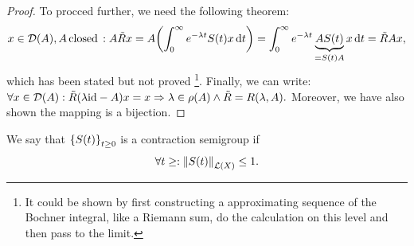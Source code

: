 \documentclass{article}
\begin{document}
\begin{proof}
    To procced further, we need the following theorem:
    \[
	    x \in \mathcal{D}(A), A \, \text{closed} \,: A \tilde{R}x = A\qty(\int_0^{\infty}e^{-\lambda t}S(t)x \dd{t}) = \int_0^{\infty}e^{- \lambda t}\underbrace{A S(t)}_{= S(t)A} x \dd{t} = \tilde{R}Ax,
    \]
    which has been stated but not proved \footnote{It could be shown by first constructing a approximating sequence of the Bochner integral, like a Riemann sum, do the calculation on this level and then pass to the limit.}. Finally, we can write: $\forall x \in \mathcal{D}(A): \tilde{R}\qty(\lambda \text{id}-A)x = x \Rightarrow \lambda \in \rho(A) \wedge \tilde{R} = R(\lambda, A).$
    Moreover, we have also shown the mapping is a bijection.
\end{proof}

\begin{definition}
	We say that $\qty{S(t)}_{t\geq 0}$ is a contraction semigroup if
	\[
		\forall t\geq: \norm{S(t)}_{\mathcal{L}(X)} \leq 1.
	\]
\end{definition}
\end{document}

